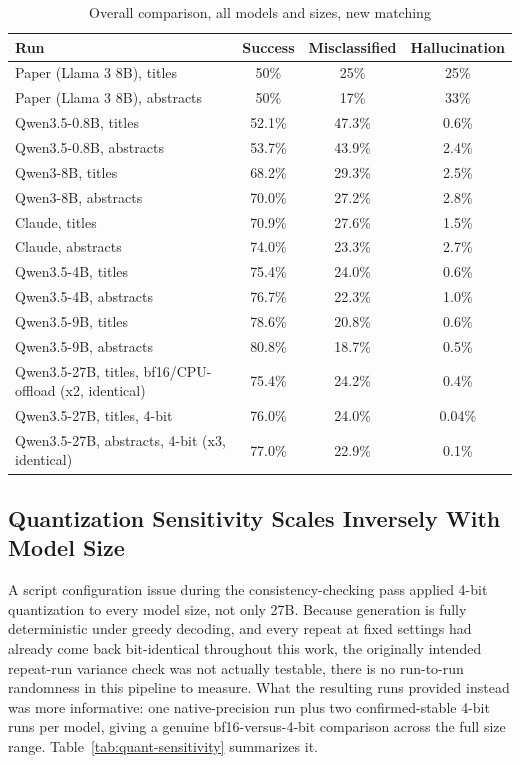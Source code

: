 \begin{table}[h]
\centering
\caption{Overall comparison, all models and sizes, new matching}
\label{tab:full-comparison}
\begin{tabular}{lccc}
\toprule
Run & Success & Misclassified & Hallucination \\
\midrule
Paper (Llama 3 8B), titles & 50\% & 25\% & 25\% \\
Paper (Llama 3 8B), abstracts & 50\% & 17\% & 33\% \\
Qwen3.5-0.8B, titles & 52.1\% & 47.3\% & 0.6\% \\
Qwen3.5-0.8B, abstracts & 53.7\% & 43.9\% & 2.4\% \\
Qwen3-8B, titles & 68.2\% & 29.3\% & 2.5\% \\
Qwen3-8B, abstracts & 70.0\% & 27.2\% & 2.8\% \\
Claude, titles & 70.9\% & 27.6\% & 1.5\% \\
Claude, abstracts & 74.0\% & 23.3\% & 2.7\% \\
Qwen3.5-4B, titles & 75.4\% & 24.0\% & 0.6\% \\
Qwen3.5-4B, abstracts & 76.7\% & 22.3\% & 1.0\% \\
Qwen3.5-9B, titles & 78.6\% & 20.8\% & 0.6\% \\
Qwen3.5-9B, abstracts & 80.8\% & 18.7\% & 0.5\% \\
Qwen3.5-27B, titles, bf16/CPU-offload (x2, identical) & 75.4\% & 24.2\% & 0.4\% \\
Qwen3.5-27B, titles, 4-bit & 76.0\% & 24.0\% & 0.04\% \\
Qwen3.5-27B, abstracts, 4-bit (x3, identical) & 77.0\% & 22.9\% & 0.1\% \\
\bottomrule
\end{tabular}
\end{table}

\subsection{Quantization Sensitivity Scales Inversely With Model Size}
\label{sec:quant-sensitivity}

A script configuration issue during the consistency-checking pass applied 4-bit quantization to every model size, not only 27B. Because generation is fully deterministic under greedy decoding, and every repeat at fixed settings had already come back bit-identical throughout this work, the originally intended repeat-run variance check was not actually testable, there is no run-to-run randomness in this pipeline to measure. What the resulting runs provided instead was more informative: one native-precision run plus two confirmed-stable 4-bit runs per model, giving a genuine bf16-versus-4-bit comparison across the full size range. Table~\ref{tab:quant-sensitivity} summarizes it.

